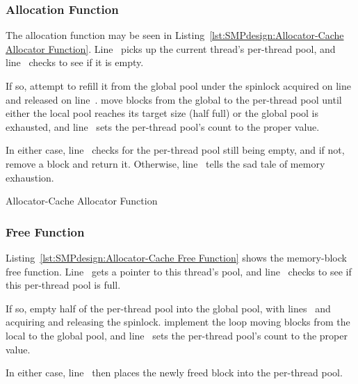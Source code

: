 \subsubsection{Allocation Function}

\begin{fcvref}
The allocation function  may be seen in
Listing~\ref{lst:SMPdesign:Allocator-Cache Allocator Function}.
Line~ picks up the current thread's per-thread pool,
and line~ checks to see if it is empty.

If so,  attempt to refill it
from the global pool
under the spinlock acquired on line~ and released on line~.
 move blocks from the global
to the per-thread pool until
either the local pool reaches its target size (half full) or
the global pool is exhausted, and line~ sets the per-thread pool's
count to the proper value.

In either case, line~ checks for the per-thread
pool still being
empty, and if not,  remove a block and return it.
Otherwise, line~ tells the sad tale of memory exhaustion.
\end{fcvref}

\begin{listing}[tbp]

\caption{Allocator-Cache Allocator Function}
\label{lst:SMPdesign:Allocator-Cache Allocator Function}
\end{listing}

\subsubsection{Free Function}

\begin{fcvref}
Listing~\ref{lst:SMPdesign:Allocator-Cache Free Function} shows
the memory-block free function.
Line~ gets a pointer to this thread's pool, and
line~ checks to see if this per-thread pool is full.

If so,  empty half of the per-thread pool
into the global pool,
with lines~ and~ acquiring and releasing the spinlock.
 implement the loop moving blocks
from the local to the
global pool, and line~ sets the per-thread pool's count to the proper
value.

In either case, line~ then places the newly freed block into the
per-thread pool.
\end{fcvref}

